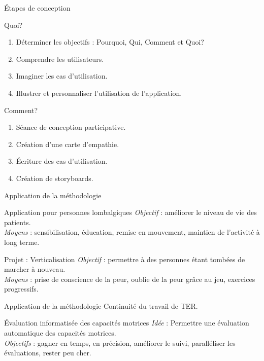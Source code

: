 \documentclass{beamer}
\begin{document}
		\begin{frame}{Étapes de conception}
			\begin{block}{Quoi?}
				\begin{enumerate}
					\item<1> Déterminer les objectifs : Pourquoi, Qui, Comment et Quoi? 
					\item<2> Comprendre les utilisateurs.
					\item<3> Imaginer les cas d'utilisation.
					\item<4> Illustrer et personnaliser l'utilisation de l'application.
				\end{enumerate}
			\end{block}
			\begin{exampleblock}{Comment?}
				\begin{enumerate}
					\item<1> Séance de conception participative.
					\item<2> Création d'une carte d'empathie.
					\item<3> Écriture des cas d'utilisation.
					\item<4> Création de storyboards.
				\end{enumerate}
			\end{exampleblock}
		\end{frame}
		
		\begin{frame}{Application de la méthodologie}
			\begin{block}{Application pour personnes lombalgiques}
			\emph{Objectif} : améliorer le niveau de vie des patients.\\
			\emph{Moyens} : sensibilisation, éducation, remise en mouvement, maintien de l'activité à long terme.
			\end{block}\pause
			
			\begin{block}{Projet : Verticalisation}
				\emph{Objectif} : permettre à des personnes étant tombées de marcher à nouveau.\\
				\emph{Moyens} : prise de conscience de la peur, oublie de la peur grâce au jeu, exercices progressifs.
			\end{block}			
		\end{frame}
		
		\begin{frame}{Application de la méthodologie}
		Continuité du travail de TER.
			\begin{block}{Évaluation informatisée des capacités motrices}
				\emph{Idée} : Permettre une évaluation automatique des capacités motrices.\\
				\emph{Objectifs} : gagner en temps, en précision, améliorer le suivi, paralléliser les évaluations, rester peu cher.
			\end{block}		
		\end{frame}
	
\end{document}
